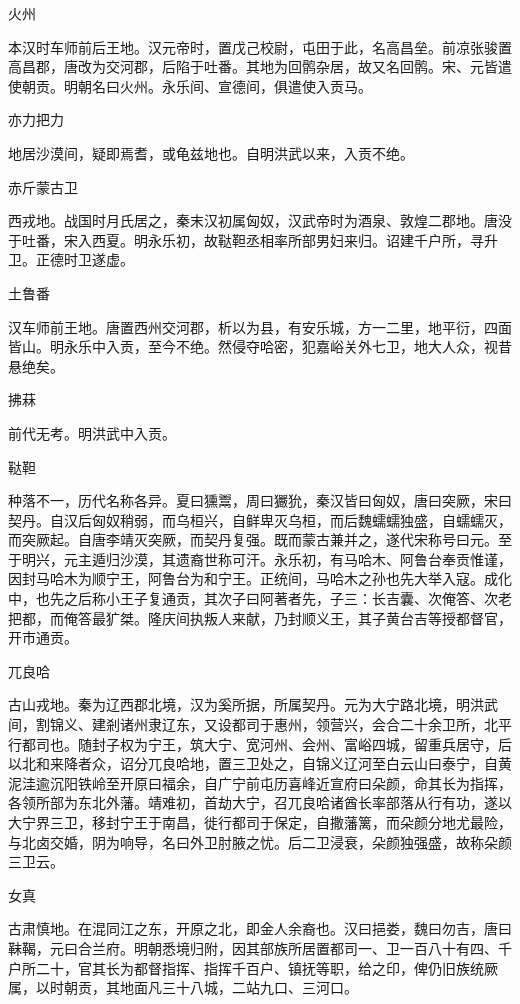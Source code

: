 \documentclass[a4paper,12pt,UTF8,twoside]{ctexbook}
\begin{document}
    火州
    
    本汉时车师前后王地。汉元帝时，置戊己校尉，屯田于此，名高昌垒。前凉张骏置高昌郡，唐改为交河郡，后陷于吐番。其地为回鹘杂居，故又名回鹘。宋、元皆遣使朝贡。明朝名曰火州。永乐间、宣德间，俱遣使入贡马。
    
    亦力把力
    
    地居沙漠间，疑即焉耆，或龟兹地也。自明洪武以来，入贡不绝。
    
    赤斤蒙古卫
    
    西戎地。战国时月氏居之，秦末汉初属匈奴，汉武帝时为酒泉、敦煌二郡地。唐没于吐番，宋入西夏。明永乐初，故鞑靼丞相率所部男妇来归。诏建千户所，寻升卫。正德时卫遂虚。
    
    土鲁番
    
    汉车师前王地。唐置西州交河郡，析以为县，有安乐城，方一二里，地平衍，四面皆山。明永乐中入贡，至今不绝。然侵夺哈密，犯嘉峪关外七卫，地大人众，视昔悬绝矣。
    
    拂菻
    
    前代无考。明洪武中入贡。
    
    鞑靼
    
    种落不一，历代名称各异。夏曰獯鬻，周曰玁狁，秦汉皆曰匈奴，唐曰突厥，宋曰契丹。自汉后匈奴稍弱，而乌桓兴，自鲜卑灭乌桓，而后魏蠕蠕独盛，自蠕蠕灭，而突厥起。自唐李靖灭突厥，而契丹复强。既而蒙古兼并之，遂代宋称号曰元。至于明兴，元主遁归沙漠，其遗裔世称可汗。永乐初，有马哈木、阿鲁台奉贡惟谨，因封马哈木为顺宁王，阿鲁台为和宁王。正统间，马哈木之孙也先大举入寇。成化中，也先之后称小王子复通贡，其次子曰阿著者先，子三：长吉囊、次俺答、次老把都，而俺答最犷桀。隆庆间执叛人来献，乃封顺义王，其子黄台吉等授都督官，开市通贡。
    
    兀良哈
    
    古山戎地。秦为辽西郡北境，汉为奚所据，所属契丹。元为大宁路北境，明洪武间，割锦义、建剎诸州隶辽东，又设都司于惠州，领营兴，会合二十余卫所，北平行都司也。随封子权为宁王，筑大宁、宽河州、会州、富峪四城，留重兵居守，后以北和来降者众，诏分兀良哈地，置三卫处之，自锦义辽河至白云山曰泰宁，自黄泥洼逾沉阳铁岭至开原曰福余，自广宁前屯历喜峰近宣府曰朵颜，命其长为指挥，各领所部为东北外藩。靖难初，首劫大宁，召兀良哈诸酋长率部落从行有功，遂以大宁界三卫，移封宁王于南昌，徙行都司于保定，自撒藩篱，而朵颜分地尤最险，与北卤交婚，阴为响导，名曰外卫肘腋之忧。后二卫浸衰，朵颜独强盛，故称朵颜三卫云。
    
    女真
    
    古肃慎地。在混同江之东，开原之北，即金人余裔也。汉曰挹娄，魏曰勿吉，唐曰靺鞨，元曰合兰府。明朝悉境归附，因其部族所居置都司一、卫一百八十有四、千户所二十，官其长为都督指挥、指挥千百户、镇抚等职，给之印，俾仍旧族统厥属，以时朝贡，其地面凡三十八城，二站九口、三河口。
    
\end{document}
